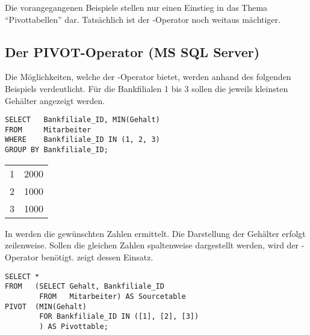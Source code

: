           Die vorangegangenen Beispiele stellen nur einen Einstieg in das Thema \enquote{Pivottabellen} dar. Tatsächlich ist der -Operator noch weitaus mächtiger.
      \subsection{Der PIVOT-Operator (MS SQL Server)}
        Die Möglichkeiten, welche der -Operator bietet, werden anhand des folgenden Beispiels verdeutlicht. Für die Bankfilialen 1 bis 3 sollen die jeweils kleinsten Gehälter angezeigt werden.
        \begin{lstlisting}[language=ms_sql,caption={Die niedrigsten Gehälter in den Filialen 1 bis 3},label=sql06_22]
SELECT   Bankfiliale_ID, MIN(Gehalt)
FROM     Mitarbeiter
WHERE    Bankfiliale_ID IN (1, 2, 3)
GROUP BY Bankfiliale_ID;
        \end{lstlisting}
\clearpage
        \begin{center}
          \begin{small}
            \tablehead{}
            \begin{mssql}
              \begin{supertabular}{ll}
                1 & 2000 \\
                2 & 1000 \\
                3 & 1000 \\
              \end{supertabular}
            \end{mssql}
          \end{small}
        \end{center}
        In  werden die gewünschten Zahlen ermittelt. Die Darstellung der Gehälter erfolgt zeilenweise. Sollen die gleichen Zahlen spaltenweise dargestellt werden, wird der -Operator benötigt.  zeigt dessen Einsatz.
        \begin{lstlisting}[language=ms_sql,caption={Das Ergebnis als Pivottabelle},label=sql06_23]
SELECT *
FROM   (SELECT Gehalt, Bankfiliale_ID
        FROM   Mitarbeiter) AS Sourcetable
PIVOT  (MIN(Gehalt)
        FOR Bankfiliale_ID IN ([1], [2], [3])
        ) AS Pivottable;
        \end{lstlisting}
